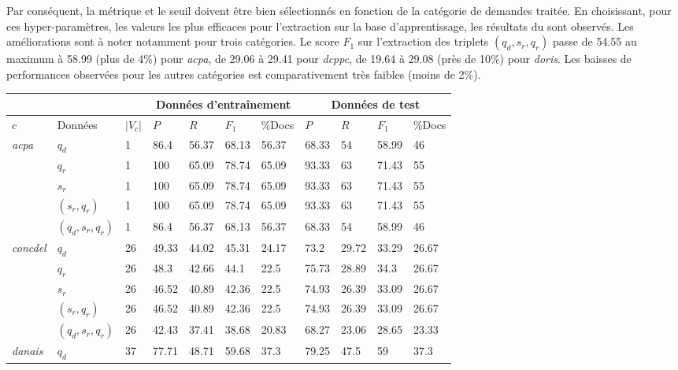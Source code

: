 Par conséquent, la métrique et le seuil doivent être bien sélectionnés en fonction de la catégorie de demandes traitée. En choisissant, pour ces hyper-paramètres, les valeurs les plus efficaces pour l'extraction sur la base d'apprentissage, les résultats du  sont observés. Les améliorations sont à noter notamment pour trois catégories. Le score $F_1$ sur l'extraction des triplets $(q_d,s_r, q_r)$ passe de 54.55 au maximum à 58.99 (plus de 4\%) pour \textit{acpa}, de 29.06 à 29.41 pour \textit{dcppc}, de 19.64 à 29.08 (près de 10\%) pour \textit{doris}. Les baisses de performances observées pour les autres catégories est comparativement très faibles (moins de 2\%).
 

\begin{table}[!htb]
\footnotesize
\begin{center}
	\begin{tabular}{l|l|l|llll|llll}
			 \hline
		& & & \multicolumn{4}{c|}{Données d'entraînement} & \multicolumn{4}{c}{Données de test} \\ \hline
		$c$ & Données & $\vert V_c \vert$ & $P$ & $R$ & $F_1$ & \%Docs & $P$ & $R$ & $F_1$ & \%Docs \\ \hline
		\multirow{5}{*}{\textit{acpa}} & $q_d$ & 1 & 86.4 & 56.37 & 68.13 & 56.37 & 68.33 & 54 & 58.99 & 46 \\
		& $q_r$ & 1 & 100 & 65.09 & 78.74 & 65.09 & 93.33 & 63 & 71.43 & 55 \\
		& $s_r$ & 1 & 100 & 65.09 & 78.74 & 65.09 & 93.33 & 63 & 71.43 & 55 \\
		& $(s_r, q_r)$ & 1 & 100 & 65.09 & 78.74 & 65.09 & 93.33 & 63 & 71.43 & 55 \\
		& $(q_d,s_r, q_r)$ & 1 & 86.4 & 56.37 & 68.13 & 56.37 & 68.33 & 54 & 58.99 & 46 \\ \hline
		\multirow{5}{*}{\textit{concdel}} & $q_d$ & 26 & 49.33 & 44.02 & 45.31 & 24.17 & 73.2 & 29.72 & 33.29 & 26.67 \\
		& $q_r$ & 26 & 48.3 & 42.66 & 44.1 & 22.5 & 75.73 & 28.89 & 34.3 & 26.67 \\
		& $s_r$ & 26 & 46.52 & 40.89 & 42.36 & 22.5 & 74.93 & 26.39 & 33.09 & 26.67 \\
		& $(s_r, q_r)$ & 26 & 46.52 & 40.89 & 42.36 & 22.5 & 74.93 & 26.39 & 33.09 & 26.67 \\
		& $(q_d,s_r, q_r)$ & 26 & 42.43 & 37.41 & 38.68 & 20.83 & 68.27 & 23.06 & 28.65 & 23.33 \\ \hline
		\multirow{5}{*}{\textit{danais}} & $q_d$ & 37 & 77.71 & 48.71 & 59.68 & 37.3 & 79.25 & 47.5 & 59 & 37.3 \\

\end{tabular}
\end{center}
\end{table}

